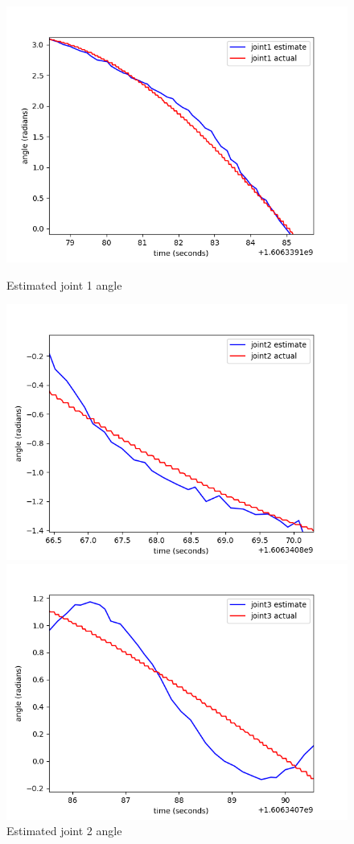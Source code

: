 \documentclass[11pt]{article}
\begin{document}
\begin{figure}[!htb]
    \includegraphics[width=\linewidth]{../figures/joint1.png}
    \caption{Estimated joint 1 angle}
\endminipage\hfill
{}
    \includegraphics[width=\linewidth]{../figures/04_joint2.png}
    \caption{Estimated joint 2 angle}
\endminipage\hfill
{}
    \includegraphics[width=\linewidth]{../figures/04_joint3.png}

\end{figure}
\end{document}
